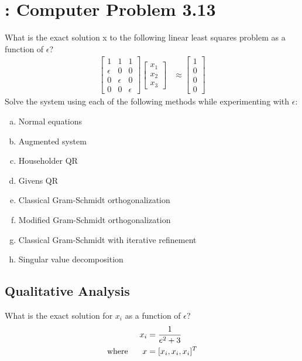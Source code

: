 \documentclass[paper=a4, fontsize=11pt]{scrartcl}
\numberwithin{equation}{section}		%
\numberwithin{figure}{section}			%
\numberwithin{table}{section}				%
\begin{document}
\section{: Computer Problem 3.13}
What is the exact solution x to the following linear least squares problem as a function of $\epsilon$?
\begin{align}
	\begin{bmatrix}
		1 & 1 & 1 \\ \epsilon & 0 & 0 \\ 0 & \epsilon & 0 \\ 0 & 0 & \epsilon
	\end{bmatrix}
	\begin{bmatrix}
		x_1 \\ x_2 \\ x_3
	\end{bmatrix}
	&\approx
	\begin{bmatrix}
		1 \\ 0 \\ 0 \\ 0
	\end{bmatrix}
\end{align}
Solve the system using each of the following methods while experimenting with $\epsilon$:
\begin{enumerate}[(a)]
	\item Normal equations \vspace{-2mm}
	\item Augmented system \vspace{-2mm}
	\item Householder QR \vspace{-2mm}
	\item Givens QR \vspace{-2mm}
	\item Classical Gram-Schmidt orthogonalization \vspace{-2mm}
	\item Modified Gram-Schmidt orthogonalization \vspace{-2mm}
	\item Classical Gram-Schmidt with iterative refinement \vspace{-2mm}
	\item Singular value decomposition \vspace{-2mm}
\end{enumerate}

\vspace{4mm}
\subsection{Qualitative Analysis}
What is the exact solution for $x_i$ as a function of $\epsilon$?
\begin{align}
	x_i &= \frac{1}{e^2 + 3} \\
	\label{eq:3.8-truex}
	\textnormal{where \hspace{5mm}} x &= [x_i, x_i, x_i]^T	
\end{align}
\end{document}
